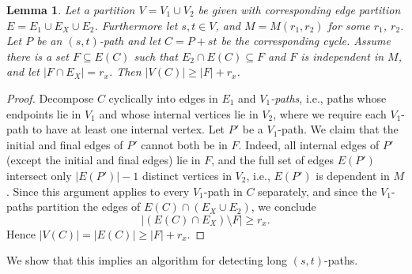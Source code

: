 \documentclass[10pt,a4paper]{article}
\newtheorem{lemma}{Lemma}[section]
\begin{document}
\begin{lemma} \label{lemma:long-cycle-rank}
  Let a partition $V=V_1 \cup V_2$ be given with corresponding edge
  partition $E=E_1 \cup E_X \cup E_2$. Furthermore let $s, t \in V$,
  and $M=M(r_1,r_2)$ for some $r_1$, $r_2$.  
  Let $P$ be an $(s,t)$-path and let $C=P+st$ be the corresponding cycle.
  Assume there is a set $F \subseteq E(C)$ such that $E_2 \cap E(C) \subseteq F$
  and $F$ is independent in $M$, and let $|F \cap E_X|=r_x$. 
  Then $|V(C)| \geq |F|+r_x$. 
\end{lemma}
\begin{proof}
  Decompose $C$ cyclically into edges in $E_1$ and \emph{$V_1$-paths},
  i.e., paths whose endpoints lie in $V_1$ and whose internal vertices lie
  in $V_2$, where we require each $V_1$-path to have at least one
  internal vertex. Let $P'$ be a $V_1$-path. We claim that the initial and final
  edges of $P'$ cannot both be in $F$. Indeed, all internal edges of
  $P'$ (except the initial and final edges) lie in $F$, and the full
  set of edges $E(P')$ intersect only $|E(P')|-1$ distinct vertices in
  $V_2$, i.e., $E(P')$ is dependent in $M$. Since this argument applies
  to every $V_1$-path in $C$ separately, and since the $V_1$-paths partition
  the edges of $E(C) \cap (E_X \cup E_2)$, we conclude
  \[
    |(E(C) \cap E_X) \setminus F| \geq r_x.
  \]
  Hence $|V(C)|=|E(C)| \geq |F|+r_x$.
\end{proof}

We show that this implies an algorithm for detecting long $(s,t)$-paths.
\end{document}
